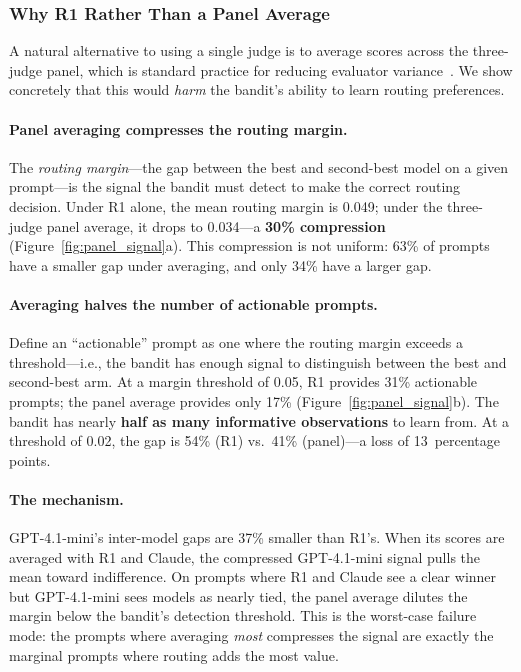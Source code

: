 \subsubsection{Why R1 Rather Than a Panel Average}

A natural alternative to using a single judge is to average scores across
the three-judge panel, which is standard practice for reducing evaluator
variance~\cite{zheng2023judging}.  We show concretely that this would
\emph{harm} the bandit's ability to learn routing preferences.

\paragraph{Panel averaging compresses the routing margin.}
The \emph{routing margin}---the gap between the best and second-best model
on a given prompt---is the signal the bandit must detect to make the
correct routing decision.  Under R1 alone, the mean routing margin is
0.049; under the three-judge panel average, it drops to 0.034---a
\textbf{30\% compression} (Figure~\ref{fig:panel_signal}a).  This
compression is not uniform: 63\% of prompts have a smaller gap under
averaging, and only 34\% have a larger gap.

\paragraph{Averaging halves the number of actionable prompts.}
Define an ``actionable'' prompt as one where the routing margin exceeds a
threshold---i.e., the bandit has enough signal to distinguish between the
best and second-best arm.  At a margin threshold of 0.05, R1 provides
31\% actionable prompts; the panel average provides only 17\%
(Figure~\ref{fig:panel_signal}b).  The bandit has nearly
\textbf{half as many informative observations} to learn from.  At a
threshold of 0.02, the gap is 54\% (R1) vs.\ 41\% (panel)---a loss of
13~percentage points.

\paragraph{The mechanism.}
GPT-4.1-mini's inter-model gaps are 37\% smaller than R1's.  When its
scores are averaged with R1 and Claude, the compressed GPT-4.1-mini
signal pulls the mean toward indifference.  On prompts where R1 and
Claude see a clear winner but GPT-4.1-mini sees models as nearly tied,
the panel average dilutes the margin below the bandit's detection
threshold.  This is the worst-case failure mode: the prompts where
averaging \emph{most} compresses the signal are exactly the marginal
prompts where routing adds the most value.

